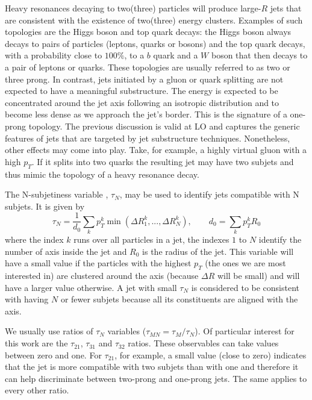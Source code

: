 Heavy resonances decaying to two(three) particles will produce large-$R$ jets that are consistent with the existence of two(three) energy clusters. Examples of such topologies are the Higgs boson and top quark decays: the Higgs boson always decays to pairs of particles (leptons, quarks or bosons) and the top quark decays, with a probability close to $100\%$, to a $b$ quark and a $W$ boson that then decays to a pair of leptons or quarks. These topologies are usually referred to as two or three prong. In contrast, jets initiated by a gluon or quark splitting are not expected to have a meaningful substructure. The energy is expected to be concentrated around the jet axis following an isotropic distribution and to become less dense as we approach the jet's border. This is the signature of a one-prong topology. The previous discussion is valid at LO and captures the generic features of jets that are targeted by jet substructure techniques. Nonetheless, other effects may come into play. Take, for example, a highly virtual gluon with a high $p_T$. If it splits into two quarks the resulting jet may have two subjets and thus mimic the topology of a heavy resonance decay.

The N-subjetiness variable \cite{Nsubjetiness}, $\tau_N$, may be used to identify jets compatible with N subjets. It is given by 
\begin{equation}
	\tau_N = \frac{1}{d_0}\sum_{k}p_T^k \min(\Delta R_1^k,...,\Delta R_N^k), \qquad d_0=\sum_{k}p_T^k R_0
\end{equation}
where the index $k$ runs over all particles in a jet, the indexes $1$ to $N$ identify the number of axis inside the jet and $R_0$ is the radius of the jet. This variable will have a small value if the particles with the highest $p_T$ (the ones we are most interested in) are clustered around the axis (because $\Delta R$ will be small) and will have a larger value otherwise. A jet with small $\tau_N$ is considered to be consistent with having $N$ or fewer subjets because all its constituents are aligned with the axis.

We usually use ratios of $\tau_N$ variables ($\tau_{MN}=\tau_M/\tau_N$). Of particular interest for this work are the $\tau_{21}$, $\tau_{31}$ and $\tau_{32}$ ratios. These observables can take values between zero and one. For $\tau_{21}$, for example, a small value (close to zero) indicates that the jet is more compatible with two subjets than with one and therefore it can help discriminate between two-prong and one-prong jets. The same applies to every other ratio. 

